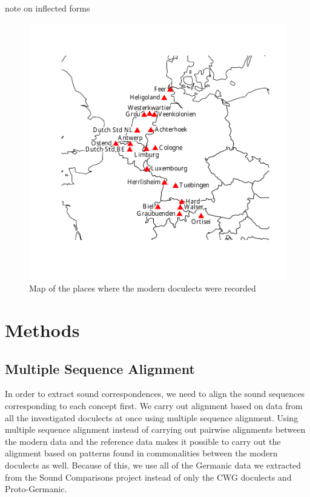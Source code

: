 \documentclass[a4paper]{article}
\begin{document}
note on inflected forms

\begin{figure}[h]
\centering
\includegraphics[width=\textwidth]{figures/map.pdf}
\caption{Map of the places where the modern doculects were recorded}
\label{fig:map}
\end{figure}


\newpage
\section{Methods}

\subsection{Multiple Sequence Alignment}
\label{s:alignments}

In order to extract sound correspondences, we need to align the sound sequences corresponding to each concept first.
We carry out alignment based on data from all the investigated doculects at once using multiple sequence alignment.
Using multiple sequence alignment instead of carrying out pairwise alignments between the modern data and the reference data makes it possible to carry out the alignment based on patterns found in commonalities between the modern doculects as well.
Because of this, we use all of the Germanic data we extracted from the Sound Comparisons project instead of only the CWG doculects and Proto-Germanic.
\end{document}
